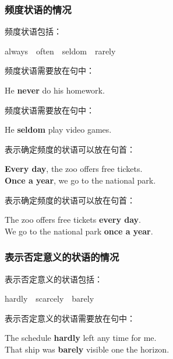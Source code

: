 \documentclass[UTF8]{ctexart}
\begin{document}
\subsubsection{频度状语的情况}
    频度状语包括：\vspace{-3pt}
    \begin{center}
        \ttfamily
        always~~often~~seldom~~rarely\\[6mm]
    \end{center}
    频度状语需要放在句中：\vspace{-3pt}
    \begin{center}
        \large
        \ttfamily
        He \textbf{never} do his homework.\\[6mm]
    \end{center}
    频度状语需要放在句中：\vspace{-3pt}
    \begin{center}
        \large
        \ttfamily
        He \textbf{seldom} play video games.\\[6mm]
    \end{center}
    表示确定频度的状语可以放在句首：
    \begin{center}
        \large
        \ttfamily
        \textbf{Every day}, the zoo offers free tickets.\\[3mm]
        \textbf{Once a year}, we go to the national park.\\[6mm]
    \end{center}
    表示确定频度的状语可以放在句首：
    \begin{center}
        \large
        \ttfamily
        The zoo offers free tickets \textbf{every day}.\\[3mm]
        We go to the national park \textbf{once a year}.
    \end{center}

\newpage

\subsubsection{表示否定意义的状语的情况}
    表示否定意义的状语包括：\vspace{-3pt}
    \begin{center}
        \ttfamily
        hardly~~scarcely~~barely\\[6mm]
    \end{center}
    表示否定意义的状语需要放在句中：
    \begin{center}
        \large
        \ttfamily
        The schedule \textbf{hardly} left any time for me.\\[3mm]
        That ship was \textbf{barely} visible one the horizon.
    \end{center}\vspace{10pt}
\end{document}
